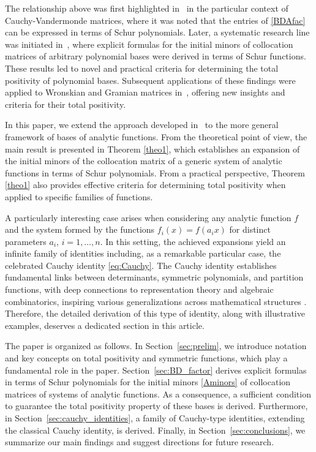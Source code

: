 \documentclass[smallextended]{svjour3}       %
\begin{document}
The relationship above was first highlighted in~\cite{YHZ} in the particular context of  Cauchy-Vandermonde matrices, where it was noted that the entries of \eqref{BDAfac} can be expressed in terms of Schur polynomials.  
 Later,  a systematic research line was initiated in~\cite{DMR}, where explicit formulas for the initial minors of collocation matrices of arbitrary polynomial bases were derived in terms of Schur functions. 
 These results led to novel and practical criteria for determining the total positivity of polynomial bases. Subsequent applications of these findings were applied to Wronskian and Gramian matrices  in~\cite{DMR2,DMR3}, offering new insights and criteria for their total positivity.

In this paper, we extend the approach developed in~\cite{DMR,DMR2,DMR3} to the more general framework of bases of analytic functions. 
From the theoretical point of view, the main result is presented in Theorem \ref{theo1}, which establishes an expansion of the initial minors of the collocation matrix of a generic system of analytic functions in terms of Schur polynomials.  
From a practical perspective, Theorem \ref{theo1} also provides effective criteria for determining total positivity when applied to specific families of functions. 


A particularly interesting case arises when considering any analytic function $f$ and the system formed by the functions  $f_i(x)= f(a_i x)$ for distinct parameters $a_i$, $i=1,\dots,n$. In this setting, the achieved expansions yield an infinite family of identities including, as a remarkable particular case, the celebrated Cauchy identity \eqref{eq:Cauchy}. 
The Cauchy identity establishes fundamental links between determinants, symmetric polynomials, and partition functions, 
 with deep connections to representation theory and algebraic combinatorics, inspiring various generalizations across mathematical structures \cite{Mac,Stanley,Bump,ortho,double,Hall,quantum}. Therefore, the detailed derivation of this type of identity, along with illustrative examples, deserves a dedicated section in this article.





The paper is organized as follows. In Section~\ref{sec:prelim}, we introduce notation and key concepts on total positivity and symmetric functions, which play a fundamental role in the paper. Section~\ref{sec:BD_factor} derives explicit formulas in terms of Schur polynomials for the initial minors \eqref{Aminors} of collocation matrices of systems of analytic functions. As a consequence, a sufficient condition to guarantee the total positivity property of these bases is derived. Furthermore,  
in Section~\ref{sec:cauchy_identities},   a family of Cauchy-type identities, extending the classical Cauchy identity, is derived.  Finally, in Section~\ref{sec:conclusions}, we summarize our main findings and suggest directions for future research. 
\end{document}
